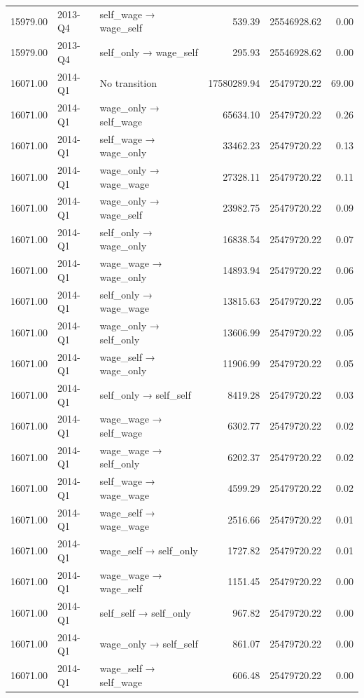 \begin{table}[ht]
{\begin{tabular}{rllrrr}
  15979.00 & 2013-Q4 & self\_wage → wage\_self & 539.39 & 25546928.62 & 0.00 \\ 
  15979.00 & 2013-Q4 & self\_only → wage\_self & 295.93 & 25546928.62 & 0.00 \\ 
  16071.00 & 2014-Q1 & No transition & 17580289.94 & 25479720.22 & 69.00 \\ 
  16071.00 & 2014-Q1 & wage\_only → self\_wage & 65634.10 & 25479720.22 & 0.26 \\ 
  16071.00 & 2014-Q1 & self\_wage → wage\_only & 33462.23 & 25479720.22 & 0.13 \\ 
  16071.00 & 2014-Q1 & wage\_only → wage\_wage & 27328.11 & 25479720.22 & 0.11 \\ 
  16071.00 & 2014-Q1 & wage\_only → wage\_self & 23982.75 & 25479720.22 & 0.09 \\ 
  16071.00 & 2014-Q1 & self\_only → wage\_only & 16838.54 & 25479720.22 & 0.07 \\ 
  16071.00 & 2014-Q1 & wage\_wage → wage\_only & 14893.94 & 25479720.22 & 0.06 \\ 
  16071.00 & 2014-Q1 & self\_only → wage\_wage & 13815.63 & 25479720.22 & 0.05 \\ 
  16071.00 & 2014-Q1 & wage\_only → self\_only & 13606.99 & 25479720.22 & 0.05 \\ 
  16071.00 & 2014-Q1 & wage\_self → wage\_only & 11906.99 & 25479720.22 & 0.05 \\ 
  16071.00 & 2014-Q1 & self\_only → self\_self & 8419.28 & 25479720.22 & 0.03 \\ 
  16071.00 & 2014-Q1 & wage\_wage → self\_wage & 6302.77 & 25479720.22 & 0.02 \\ 
  16071.00 & 2014-Q1 & wage\_wage → self\_only & 6202.37 & 25479720.22 & 0.02 \\ 
  16071.00 & 2014-Q1 & self\_wage → wage\_wage & 4599.29 & 25479720.22 & 0.02 \\ 
  16071.00 & 2014-Q1 & wage\_self → wage\_wage & 2516.66 & 25479720.22 & 0.01 \\ 
  16071.00 & 2014-Q1 & wage\_self → self\_only & 1727.82 & 25479720.22 & 0.01 \\ 
  16071.00 & 2014-Q1 & wage\_wage → wage\_self & 1151.45 & 25479720.22 & 0.00 \\ 
  16071.00 & 2014-Q1 & self\_self → self\_only & 967.82 & 25479720.22 & 0.00 \\ 
  16071.00 & 2014-Q1 & wage\_only → self\_self & 861.07 & 25479720.22 & 0.00 \\ 
  16071.00 & 2014-Q1 & wage\_self → self\_wage & 606.48 & 25479720.22 & 0.00 \\ 

\end{tabular}}
\end{table}
